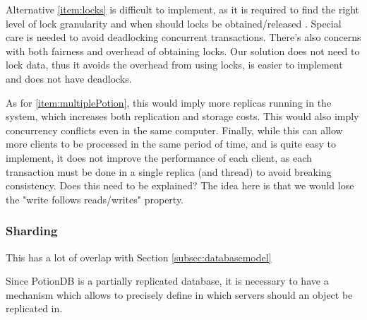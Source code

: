 \documentclass{vldb}
\newcommand{\grumbler}[2]{{\color{red}{\bf #1:} #2}}
\newcommand{\andre}[1]{\grumbler{andre}{#1}}
\begin{document}

Alternative \ref{item:locks} is difficult to implement, as it is required to find the right level of lock granularity and when should locks be obtained/released \cite{???}. 
Special care is needed to avoid deadlocking concurrent transactions. 
There's also concerns with both fairness and overhead of obtaining locks.
Our solution does not need to lock data, thus it avoids the overhead from using locks, is easier to implement and does not have deadlocks.

As for \ref{item:multiplePotion}, this would imply more replicas running in the system, which increases both replication and storage costs.
This would also imply concurrency conflicts even in the same computer.
Finally, while this can allow more clients to be processed in the same period of time, and is quite easy to implement, it does not improve the performance of each client, as each transaction must be done in a single replica (and thread) to avoid breaking consistency. \andre{Does this need to be explained? The idea here is that we would lose the "write follows reads/writes" property.}


\subsubsection{Sharding}

\andre{This has a lot of overlap with Section \ref{subsec:databasemodel}}

Since PotionDB is a partially replicated \cite{???} database, it is necessary to have a mechanism which allows to precisely define in which servers should an object be replicated in.
\end{document}
